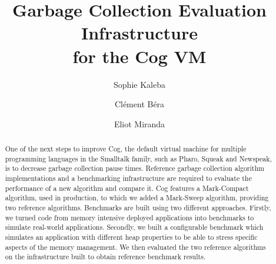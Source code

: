 \documentclass[10pt, sigplan]{acmart}
\begin{document}
\title[Garbage Collection Evaluation Infrastructure]{Garbage Collection Evaluation Infrastructure\\ for the Cog VM}

\author{Sophie Kaleba}

\author{Cl\'ement B\'era}

\author{Eliot Miranda}

\begin{abstract}
One of the next steps to improve Cog, the default virtual machine for multiple programming languages in the Smalltalk family, such as Pharo, Squeak and Newspeak, is to decrease garbage collection pause times. Reference garbage collection algorithm implementations and a benchmarking infrastructure are required to evaluate the performance of a new algorithm and compare it. Cog features a Mark-Compact algorithm, used in production, to which we added a Mark-Sweep algorithm, providing two reference algorithms. Benchmarks are built using two different approaches. Firstly, we turned code from memory intensive deployed applications into benchmarks to simulate real-world applications. Secondly, we built a configurable benchmark which simulates an application with different heap properties to be able to stress specific aspects of the memory management. We then evaluated the two reference algorithms on the infrastructure built to obtain reference benchmark results.
\end{abstract}
\end{document}
